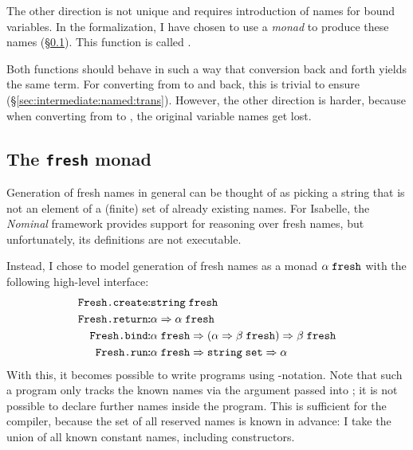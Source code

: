 The other direction is not unique and requires introduction of  names for bound variables.
In the formalization, I have chosen to use a \emph{monad} to produce these names (§\ref{sec:intermediate:named:fresh}).
This function is called .

Both functions should behave in such a way that conversion back and forth yields the same term.
For converting from  to  and back, this is trivial to ensure (§\ref{sec:intermediate:named:trans}).
However, the other direction is harder, because when converting from  to , the original variable names get lost.

\subsection{The \texttt{fresh} monad}
\label{sec:intermediate:named:fresh}

Generation of fresh names in general can be thought of as picking a string that is not an element of a (finite) set of already existing names.
For Isabelle, the \emph{Nominal} framework \cite{urban2008nominal,urban2013nominal} provides support for reasoning over fresh names, but unfortunately, its definitions are not executable.

Instead, I chose to model generation of fresh names as a monad $\alpha\;\texttt{\textup{fresh}}$ with the following high-level interface:
%
\begin{align*}
  \holtypejudgement{\holconst{Fresh.create}}{&\holtype{string}\;\holtype{fresh}} \\
  \holtypejudgement{\holconst{Fresh.return}}{&\alpha \Rightarrow \alpha \;\holtype{fresh}} \\
  \holtypejudgement{\holconst{Fresh.bind}}{&\alpha\;\holtype{fresh} \Rightarrow (\alpha \Rightarrow \beta \;\holtype{fresh}) \Rightarrow \beta \;\holtype{fresh}} \\
  \holtypejudgement{\holconst{Fresh.run}}{&\alpha\;\holtype{fresh} \Rightarrow \holtype{string}\;\holtype{set} \Rightarrow \alpha}
\end{align*}
%
With this, it becomes possible to write programs using -notation.
Note that such a program only tracks the known names via the argument passed into ; it is not possible to declare further names inside the program.
This is sufficient for the compiler, because the set of all reserved names is known in advance:
I take the union of all known constant names, including constructors.

